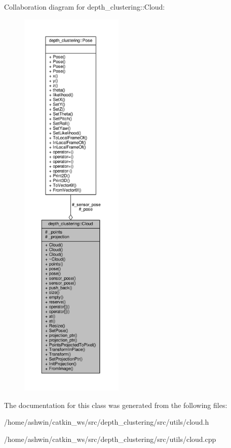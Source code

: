 Collaboration diagram for depth\+\_\+clustering\+:\+:Cloud\+:\nopagebreak
\begin{figure}[H]
\begin{center}
\leavevmode
\includegraphics[height=550pt]{classdepth__clustering_1_1Cloud__coll__graph}
\end{center}
\end{figure}


The documentation for this class was generated from the following files\+:\begin{DoxyCompactItemize}
\item 
/home/ashwin/catkin\+\_\+ws/src/depth\+\_\+clustering/src/utils/cloud.\+h\item 
/home/ashwin/catkin\+\_\+ws/src/depth\+\_\+clustering/src/utils/cloud.\+cpp\end{DoxyCompactItemize}
